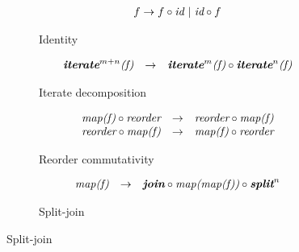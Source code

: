 \setlength{\ruleSpace}{0em}
\begin{figure}[t]
\centering
\begin{subfigure}[b]{1\linewidth}
  \begin{mdframed}
    \begin{align*}
      f \rightarrow f \circ \textit{id}\ |\ \textit{id} \circ f
    \end{align*}
  \end{mdframed}


  \caption{Identity}
  \label{fig:algo:identity}
\end{subfigure}

\vspace{\ruleSpace}
\begin{subfigure}[b]{1\linewidth}
\begin{mdframed}
$$
\begin{array}{lrl}
 \textit{\textbf{iterate}}^{m+n}\textit{(f)} & \rightarrow & \textit{\textbf{iterate}}^m\textit{(f)} \circ \textit{\textbf{iterate}}^n\textit{(f)}\\
 \end{array}
$$
\end{mdframed}
 \caption{Iterate decomposition}
 \label{fig:algo:iterate}
\end{subfigure}

\vspace{\ruleSpace}
\begin{subfigure}[b]{1\linewidth}
\begin{mdframed}
$$
\begin{array}{lrl}
 \textit{map(f)} \circ \textit{reorder} & \rightarrow & \textit{reorder} \circ \textit{map(f)}\\
 \textit{reorder} \circ \textit{map(f)} & \rightarrow & \textit{map(f)} \circ \textit{reorder}\\  
\end{array}
$$
\end{mdframed}
 \caption{Reorder commutativity}
 \label{fig:algo:reorder}
\end{subfigure}

\vspace{\ruleSpace}
\begin{subfigure}[b]{1\linewidth}
\begin{mdframed}
$$
\begin{array}{lrl}
 \textit{map(f)} & \rightarrow & \textit{\textbf{join}} \circ \textit{map(map(f))}\circ \textit{\textbf{split}}^n
\end{array}
$$
\end{mdframed}
 \caption{Split-join}
 \label{fig:algo:splitjoin}
\end{subfigure}


\end{figure}
